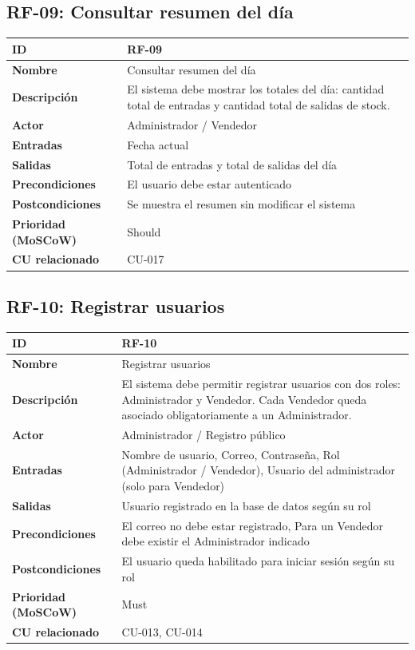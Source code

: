\documentclass[12pt, a4paper]{article}
\begin{document}
\subsection{RF-09: Consultar resumen del día}
\begin{center}
\renewcommand{\arraystretch}{1.4}
\begin{tabular}{|L{4cm}|L{12cm}|}
\hline
\textbf{ID} & RF-09 \\
\hline
\textbf{Nombre} & Consultar resumen del día \\
\hline
\textbf{Descripción} & El sistema debe mostrar los totales del día: cantidad total de entradas y cantidad total de salidas de stock. \\
\hline
\textbf{Actor} & Administrador / Vendedor \\
\hline
\textbf{Entradas} & Fecha actual \\
\hline
\textbf{Salidas} & Total de entradas y total de salidas del día \\
\hline
\textbf{Precondiciones} & El usuario debe estar autenticado \\
\hline
\textbf{Postcondiciones} & Se muestra el resumen sin modificar el sistema \\
\hline
\textbf{Prioridad (MoSCoW)} & Should \\
\hline
\textbf{CU relacionado} & CU-017 \\
\hline
\end{tabular}
\end{center}

\subsection{RF-10: Registrar usuarios}
\begin{center}
\renewcommand{\arraystretch}{1.4}
\begin{tabular}{|L{4cm}|L{12cm}|}
\hline
\textbf{ID} & RF-10 \\
\hline
\textbf{Nombre} & Registrar usuarios \\
\hline
\textbf{Descripción} & El sistema debe permitir registrar usuarios con dos roles: Administrador y Vendedor. Cada Vendedor queda asociado obligatoriamente a un Administrador. \\
\hline
\textbf{Actor} & Administrador / Registro público \\
\hline
\textbf{Entradas} & Nombre de usuario, Correo, Contraseña, Rol (Administrador / Vendedor), Usuario del administrador (solo para Vendedor) \\
\hline
\textbf{Salidas} & Usuario registrado en la base de datos según su rol \\
\hline
\textbf{Precondiciones} & El correo no debe estar registrado, Para un Vendedor debe existir el Administrador indicado \\
\hline
\textbf{Postcondiciones} & El usuario queda habilitado para iniciar sesión según su rol \\
\hline
\textbf{Prioridad (MoSCoW)} & Must \\
\hline
\textbf{CU relacionado} & CU-013, CU-014 \\
\hline
\end{tabular}
\end{center}
\end{document}
